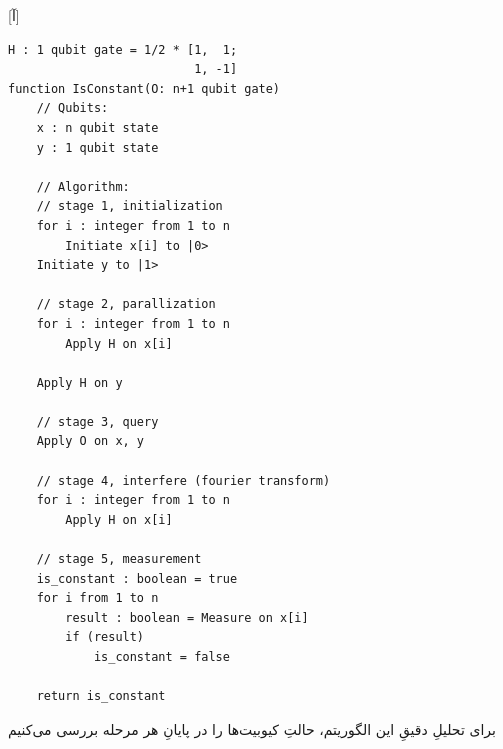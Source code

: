 \documentclass[a4paper,12pt]{article}
\begin{document}
[آ]
\begin{latin}
\begin{lstlisting}
H : 1 qubit gate = 1/2 * [1,  1;
                          1, -1]
function IsConstant(O: n+1 qubit gate)   
    // Qubits:
    x : n qubit state
    y : 1 qubit state

    // Algorithm:
    // stage 1, initialization
    for i : integer from 1 to n
        Initiate x[i] to |0>
    Initiate y to |1>

    // stage 2, parallization
    for i : integer from 1 to n
        Apply H on x[i]
       
    Apply H on y
        
    // stage 3, query
    Apply O on x, y
    
    // stage 4, interfere (fourier transform)
    for i : integer from 1 to n
        Apply H on x[i]

    // stage 5, measurement
    is_constant : boolean = true
    for i from 1 to n
        result : boolean = Measure on x[i]
        if (result)
            is_constant = false
            
    return is_constant
\end{lstlisting}
\end{latin}

برای تحلیلِ دقیقِ این الگوریتم، حالتِ کیوبیت‌ها را در پایانِ هر مرحله بررسی می‌کنیم
\end{document}
